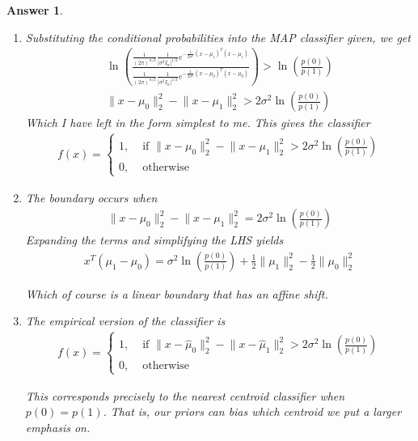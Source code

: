 \documentclass[12pt]{article}
\theoremstyle{colon}
\newtheorem*{answer}{Answer}
\begin{document}
\begin{answer}
  \

  \begin{enumerate}[label=\alph*)]
    \item Substituting the conditional probabilities into the MAP classifier given, we get
      \begin{gather*}
        \ln \left(\frac{\frac{1}{(2 \pi)^{n/2}} \frac{1}{\lvert \sigma^2 I_n \rvert^{1/2}} e^{-\frac{1}{2 \sigma^2} (x - \mu_1)^T (x - \mu_1)}}{\frac{1}{(2 \pi)^{n/2}} \frac{1}{\lvert \sigma^2 I_n \rvert^{1/2}} e^{-\frac{1}{2 \sigma^2} (x - \mu_0)^T (x - \mu_0)}} \right) > \ln \left( \frac{p(0)}{p(1)} \right) \\
        \lVert x - \mu_0 \rVert_2^2 - \lVert x - \mu_1 \rVert_2^2 > 2 \sigma^2 \ln \left( \frac{p(0)}{p(1)} \right)
      \end{gather*}
      Which I have left in the form simplest to me. This gives the classifier
      \begin{gather*}
        f(x) = \begin{cases}
          1, &\text{ if } \lVert x - \mu_0 \rVert_2^2 - \lVert x - \mu_1 \rVert_2^2 > 2 \sigma^2 \ln \left( \frac{p(0)}{p(1)} \right) \\
          0, &\text{ otherwise}
        \end{cases}
      \end{gather*}
    \item The boundary occurs when
      \begin{gather*}
        \lVert x - \mu_0 \rVert_2^2 - \lVert x - \mu_1 \rVert_2^2 = 2 \sigma^2 \ln \left( \frac{p(0)}{p(1)} \right)
      \end{gather*}
      Expanding the terms and simplifying the LHS yields
      \begin{gather*}
        x^T (\mu_1 - \mu_0) = \sigma^2 \ln \left( \frac{p(0)}{p(1)} \right) + \frac{1}{2} \lVert \mu_1 \rVert_2^2 -  \frac{1}{2} \lVert \mu_0 \rVert_2^2
      \end{gather*}

      Which of course is a linear boundary that has an affine shift.
    \item The empirical version of the classifier is
      \begin{gather*}
        f(x) = \begin{cases}
          1, &\text{ if } \lVert x - \hat{\mu}_0 \rVert_2^2 - \lVert x - \hat{\mu}_1 \rVert_2^2 > 2 \sigma^2 \ln \left( \frac{p(0)}{p(1)} \right) \\
          0, &\text{ otherwise}
        \end{cases}
      \end{gather*}

      This corresponds precisely to the nearest centroid classifier when $p(0) = p(1)$. That is, our priors can bias which centroid we put a larger emphasis on.
  \end{enumerate}
\end{answer}
\end{document}
